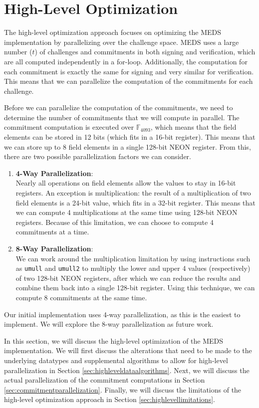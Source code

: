\documentclass[11pt,a4paper]{report}
\theoremstyle{definition}
\begin{document}
\section{High-Level Optimization}
\label{sec:highleveloptimization}
The high-level optimization approach focuses on optimizing the MEDS implementation by parallelizing over the challenge space. MEDS uses a large number ($t$) of challenges and commitments in both signing and verification, which are all computed independently in a for-loop. Additionally, the computation for each commitment is exactly the same for signing and very similar for verification. This means that we can parallelize the computation of the commitments for each challenge.

Before we can parallelize the computation of the commitments, we need to determine the number of commitments that we will compute in parallel. The commitment computation is executed over $\mathbb{F}_{4093}$, which means that the field elements can be stored in 12 bits (which fits in a 16-bit register). This means that we can store up to 8 field elements in a single 128-bit NEON register. From this, there are two possible parallelization factors we can consider.
\begin{enumerate}
  \item \textbf{4-Way Parallelization}:\\
  Nearly all operations on field elements allow the values to stay in 16-bit registers. An exception is multiplication: the result of a multiplication of two field elements is a 24-bit value, which fits in a 32-bit register. This means that we can compute 4 multiplications at the same time using 128-bit NEON registers. Because of this limitation, we can choose to compute 4 commitments at a time.
  \item \textbf{8-Way Parallelization}:\\
  We can work around the multiplication limitation by using instructions such as \texttt{umull} and \texttt{umull2} to multiply the lower and upper 4 values (respectively) of two 128-bit NEON registers, after which we can reduce the results and combine them back into a single 128-bit register. Using this technique, we can compute 8 commitments at the same time.
\end{enumerate}
Our initial implementation uses 4-way parallelization, as this is the easiest to implement. We will explore the 8-way parallelization as future work.

In this section, we will discuss the high-level optimization of the MEDS implementation. We will first discuss the alterations that need to be made to the underlying datatypes and supplemental algorithms to allow for high-level parallelization in Section \ref{sec:highleveldataalgorithms}. Next, we will discuss the actual parallelization of the commitment computations in Section \ref{sec:commitmentparallelization}. Finally, we will discuss the limitations of the high-level optimization approach in Section \ref{sec:highlevellimitations}.
\end{document}
